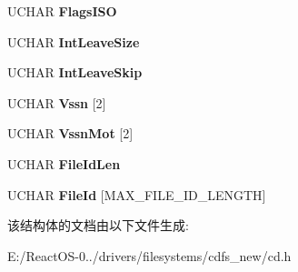 \begin{DoxyCompactItemize}
\item 
\mbox{\label{struct___r_a_w___d_i_r_e_n_t_a2735ba4a523758a568951f3414dbdec1}} 
U\+C\+H\+AR {\bfseries Flags\+I\+SO}
\item 
\mbox{\label{struct___r_a_w___d_i_r_e_n_t_acad7dff6ebeb50fb83dd924f3df75fd4}} 
U\+C\+H\+AR {\bfseries Int\+Leave\+Size}
\item 
\mbox{\label{struct___r_a_w___d_i_r_e_n_t_a9b540c6d9ee7bae26a0c8fbc1478da5b}} 
U\+C\+H\+AR {\bfseries Int\+Leave\+Skip}
\item 
\mbox{\label{struct___r_a_w___d_i_r_e_n_t_a762fe9a3933720783e705618f0a6f5ab}} 
U\+C\+H\+AR {\bfseries Vssn} \mbox{[}2\mbox{]}
\item 
\mbox{\label{struct___r_a_w___d_i_r_e_n_t_a6d2e7852f1dff895e0c2c28aea934e81}} 
U\+C\+H\+AR {\bfseries Vssn\+Mot} \mbox{[}2\mbox{]}
\item 
\mbox{\label{struct___r_a_w___d_i_r_e_n_t_a078f3c26d75b93b2e54527e4799e17e6}} 
U\+C\+H\+AR {\bfseries File\+Id\+Len}
\item 
\mbox{\label{struct___r_a_w___d_i_r_e_n_t_a4b58ec2872abf3b046f10b9aa50aefec}} 
U\+C\+H\+AR {\bfseries File\+Id} \mbox{[}M\+A\+X\+\_\+\+F\+I\+L\+E\+\_\+\+I\+D\+\_\+\+L\+E\+N\+G\+TH\mbox{]}
\end{DoxyCompactItemize}


该结构体的文档由以下文件生成\+:\begin{DoxyCompactItemize}
\item 
E\+:/\+React\+O\+S-\/0../drivers/filesystems/cdfs\+\_\+new/cd.\+h\end{DoxyCompactItemize}
